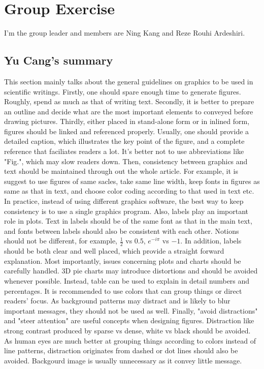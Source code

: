 \documentclass[paper=a4, fontsize=11pt]{scrartcl} %
\numberwithin{equation}{section} %
\numberwithin{figure}{section} %
\numberwithin{table}{section} %
\begin{document}
\section{Group Exercise}
	I'm the group leader and members are Ning Kang and Reze Rouhi Ardeshiri.
	
	\subsection{Yu Cang's summary}
		This section mainly talks about the general guidelines on graphics to be used in scientific writings. \newline
		Firstly, one should spare enough time to generate figures. Roughly, spend as much as that of writing text.\newline 
		Secondly, it is better to prepare an outline and decide what are the most important elements to conveyed before drawing pictures.\newline 
		Thirdly, either placed in stand-alone form or in inlined form, figures should be linked and referenced properly. Usually, one should provide a detailed caption, which illustrates the key point of the figure, and a complete reference that faciliates readers a lot. It's better not to use abbreviations like "Fig.", which may slow readers down. \newline
		Then, consistency between graphics and text should be maintained through out the whole article. For example, it is suggest to use figures of same sacles, take same line width, keep fonts in figures as same as that in text, and choose color coding according to that used in text etc. In practice, instead of using different graphics software, the best way to keep consistency is to use a single graphics program. \newline
		Also, labels play an important role in plots. Text in labels should be of the same font as that in the main text, and fonts between labels should also be consistent with each other. Notions should not be different, for example, $\frac{1}{2}$ vs $0.5$, $e^{-i\pi}$ vs $-1$. In addition, labels should be both clear and well placed, which provide a straight forward explanation.\newline
		Most importantly, issues concerning plots and charts should be carefully handled. 3D pie charts may introduce distortions and should be avoided whenever possible. Instead, table can be used to explain in detail numbers and percentages. It is recommended to use colors that can group things or direct readers' focus. As background patterns may distract and is likely to blur important messages, they should not be used as well. \newline
		Finally, "avoid distractions" and "steer attention" are useful concepts when designing figures. Distraction like strong contrast produced by sparse vs dense, white vs black should be avoided. As human eyes are much better at grouping things according to colors instead of line patterns, distraction originates from dashed or dot lines should also be avoided. Backgourd image is usually unnecessary as it convey little message.  
		
\end{document}
